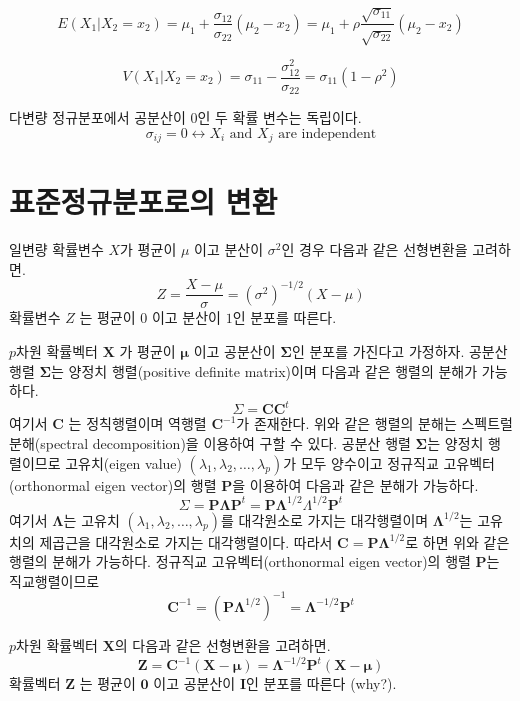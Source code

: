 \documentclass[
]{book}
\theoremstyle{definition}
\theoremstyle{definition}
\theoremstyle{definition}
\theoremstyle{remark}
\begin{document}
\[ 
  E( X_1 |  X_2 =  x_2 ) =  \mu_1 +  \frac{\sigma_{12}}{\sigma_{22}} ( \mu_2 -  x_2)  = \mu_1 +  \rho \frac{\sqrt{\sigma_{11}}}{\sqrt{\sigma_{22}}} ( \mu_2 -  x_2) \]

\[
  V( X_1 |  X_2 =  x_2 )  =  \sigma_{11} - \frac{\sigma^2_{12}}{\sigma_{22}}  = \sigma_{11}(1-\rho^2)
  \]

다변량 정규분포에서 공분산이 0인 두 확률 변수는 독립이다.
\[ \sigma_{ij} = 0 \leftrightarrow X_i \text{ and } X_j \text{ are independent} \]

\hypertarget{uxd45cuxc900uxc815uxaddcuxbd84uxd3ecuxb85cuxc758-uxbcc0uxd658}{%
\section{표준정규분포로의 변환}\label{uxd45cuxc900uxc815uxaddcuxbd84uxd3ecuxb85cuxc758-uxbcc0uxd658}}

일변량 확률변수 \(X\)가 평균이 \(\mu\) 이고 분산이 \(\sigma^2\)인 경우 다음과 같은 선형변환을 고려하면.
\[ Z = \frac{X - \mu}{\sigma} = (\sigma^2)^{-1/2} (X-\mu) \]
확률변수 \(Z\) 는 평균이 \(0\) 이고 분산이 \(1\)인 분포를 따른다.

\(p\)차원 확률벡터 \(\bm X\) 가 평균이 \(\bm \mu\) 이고 공분산이 \(\bm \Sigma\)인 분포를 가진다고 가정하자.
공분산 행렬 \(\bm \Sigma\)는 양정치 행렬(positive definite matrix)이며 다음과 같은 행렬의 분해가 가능하다.
\[ \Sigma = \bm C \bm C^t \]
여기서 \(\bm C\) 는 정칙행렬이며 역행렬 \(\bm C^{-1}\)가 존재한다.
위와 같은 행렬의 분해는 스펙트럴 분해(spectral decomposition)을 이용하여 구할 수 있다. 공분산 행렬 \(\bm \Sigma\)는 양정치 행렬이므로 고유치(eigen value) \((\lambda_1, \lambda_2,\dots, \lambda_p)\)가 모두 양수이고 정규직교 고유벡터(orthonormal eigen vector)의 행렬 \(\bm P\)을 이용하여 다음과 같은 분해가 가능하다.
\[ \Sigma = \bm P \bm \Lambda \bm P^t = \bm P \bm \Lambda^{1/2} \Lambda^{1/2} \bm P^t \]
여기서 \(\bm \Lambda\)는 고유치 \((\lambda_1, \lambda_2,\dots, \lambda_p)\)를 대각원소로 가지는
대각행렬이며 \(\bm \Lambda^{1/2}\)는 고유치의 제곱근을 대각원소로 가지는
대각행렬이다. 따라서 \(\bm C = \bm P \bm \Lambda^{1/2}\)로 하면 위와 같은 행렬의 분해가 가능하다.
정규직교 고유벡터(orthonormal eigen vector)의 행렬 \(\bm P\)는 직교행렬이므로
\[ \bm C^{-1} =  (\bm P \bm \Lambda^{1/2})^{-1} = \bm \Lambda^{-1/2} \bm P^t \]

\(p\)차원 확률벡터 \(\bm X\)의 다음과 같은 선형변환을 고려하면.
\[ \bm Z = \bm C^{-1} ( \bm X- \bm \mu) = \bm \Lambda^{-1/2} \bm P^t ( \bm X- \bm \mu)  \]
확률벡터 \(\bm Z\) 는 평균이 \(\bm 0\) 이고 공분산이 \(\bm I\)인 분포를 따른다 (why?).
\end{document}
